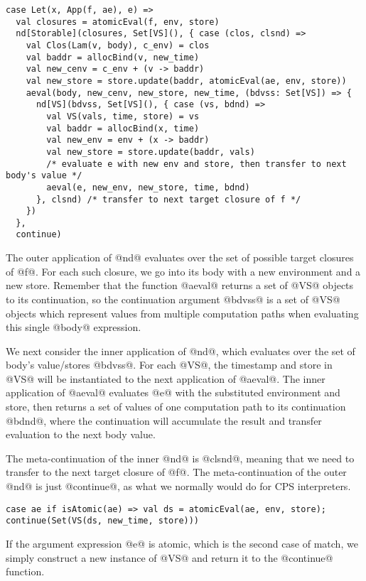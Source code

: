 \documentclass[acmsmall]{acmart}\settopmatter{}
\begin{document}
\begin{lstlisting}
case Let(x, App(f, ae), e) =>
  val closures = atomicEval(f, env, store)
  nd[Storable](closures, Set[VS](), { case (clos, clsnd) =>
    val Clos(Lam(v, body), c_env) = clos
    val baddr = allocBind(v, new_time)
    val new_cenv = c_env + (v -> baddr)
    val new_store = store.update(baddr, atomicEval(ae, env, store))
    aeval(body, new_cenv, new_store, new_time, (bdvss: Set[VS]) => {
      nd[VS](bdvss, Set[VS](), { case (vs, bdnd) =>
        val VS(vals, time, store) = vs
        val baddr = allocBind(x, time)
        val new_env = env + (x -> baddr)
        val new_store = store.update(baddr, vals)
        /* evaluate e with new env and store, then transfer to next body's value */
        aeval(e, new_env, new_store, time, bdnd)
      }, clsnd) /* transfer to next target closure of f */
    })
  },
  continue)
\end{lstlisting}

The outer application of @nd@ evaluates over the set of possible target closures of
@f@. For each such closure, we go into its body with a new environment and a new store.
Remember that the function @aeval@ returns a set of @VS@ objects to its continuation,
so the continuation argument @bdvss@ is a set of @VS@ objects which represent values
from multiple computation paths when evaluating this single @body@ expression.

We next consider the inner application of @nd@, which evaluates over the set of body's 
value/stores @bdvss@. For each @VS@, the timestamp and store in @VS@ will be instantiated to
the next application of @aeval@. The inner application of @aeval@ evaluates @e@ with the
substituted environment and store, then returns a set of values of one computation path 
to its continuation @bdnd@, where the continuation will accumulate the result and 
transfer evaluation to the next body value.

The meta-continuation of the inner @nd@ is @clsnd@, meaning that we need to transfer 
to the next target closure of @f@. The meta-continuation of the outer @nd@ is just 
@continue@, as what we normally would do for CPS interpreters.

\begin{lstlisting}
case ae if isAtomic(ae) => val ds = atomicEval(ae, env, store); continue(Set(VS(ds, new_time, store)))
\end{lstlisting}

If the argument expression @e@ is atomic, which is the second case of match, we simply 
construct a new instance of @VS@ and return it to the @continue@ function.
\end{document}
